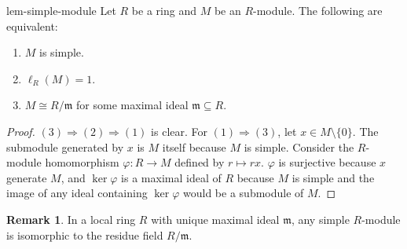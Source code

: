 \documentclass[a4paper,10pt]{article}
\makeatletter
\theoremstyle{definition}
\newtheorem{remark}[tcb@cnt@theorem]{Remark}
\makeatother
\begin{document}
\begin{lemma}{}{lem-simple-module}
Let $R$ be a ring and $M$ be an $R$-module.
The following are equivalent:
\begin{enumerate}[label=(\arabic*)]
\item
$M$ is simple.
\item
$\ell_R(M)=1$.
\item 
$M\cong R/\mathfrak{m}$ for some maximal ideal $\mathfrak{m}\subseteq R$.
\end{enumerate}
\end{lemma}
\begin{proof}
$(3)\Longrightarrow(2)\Longrightarrow(1)$ is clear.
For $(1)\Longrightarrow(3)$, let $x\in M\setminus\{0\}$.
The submodule generated by $x$ is $M$ itself because $M$ is simple.
Consider the $R$-module homomorphism $\varphi:R\to M$ defined by $r\mapsto rx$.
$\varphi$ is surjective because $x$ generate $M$,
and $\ker\varphi$ is a maximal ideal of $R$ because $M$ is simple 
and the image of any ideal containing $\ker\varphi$ would be a submodule of $M$.
\end{proof}

\begin{remark}
In a local ring $R$ with unique maximal ideal $\mathfrak{m}$,
any simple $R$-module is isomorphic to the residue field $R/\mathfrak{m}$.
\end{remark}
\end{document}
